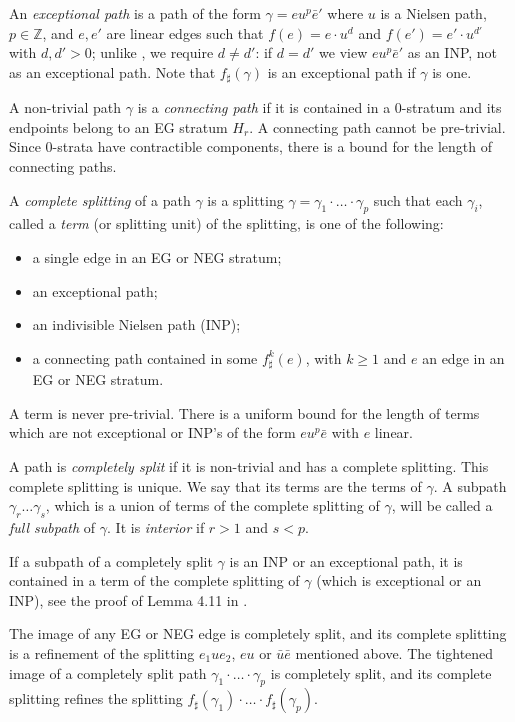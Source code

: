 \documentclass[11pt]{amsart}
\theoremstyle{remark}
\newcommand{\Z}{{\mathbb {Z}}}
\begin{document}
 An \emph{exceptional path} is a path of the form $\gamma=eu^p\bar e'$ where $u$ is a Nielsen path, $p\in\Z$,   
and $e,e'$ are  linear edges such that $f(e)=e\cdot u^d$ and $f(e')=e'\cdot u^{d'}$ with $d,d'>0$; unlike \cite{recogn}, we require 
 $d\ne d'$: if $d=d'$ we view $eu^p\bar e'$ as an INP, 
not as an exceptional path. 
 Note that $f_\sharp(\gamma)$ is an exceptional path if $\gamma$ is one.  

A  non-trivial path $\gamma$ is a \emph{connecting path}  if it is contained in a 0-stratum and its endpoints belong to  an EG stratum $H_r$. A connecting path cannot be pre-trivial. Since 0-strata have contractible components, there is a bound for the length of connecting paths. 

A \emph{complete splitting} of a path $\gamma$ is a splitting $\gamma=\gamma_1\cdot{\dots}\cdot \gamma_p$ such that each $\gamma_i$, called a \emph{term}  (or splitting unit) of the splitting, is one of the following:
\begin{itemize}
\item a single edge in an EG or NEG stratum;
\item an exceptional path;
\item an indivisible Nielsen path (INP);
\item  a connecting path contained in some $f^k_\sharp(e)$, with $k\ge1$ and $e$ an edge in an EG or NEG stratum. 

\end{itemize}


A term is never pre-trivial. There is a uniform bound for the length of terms which are not exceptional or INP's of the form $eu^p\bar e$ with $e$ linear.  


A path is \emph{completely split} if it is non-trivial and has a complete splitting.    This complete splitting is unique. We say that its terms are the terms of $\gamma$. A subpath $\gamma_r\dots\gamma_s$, which is a union of   terms of the complete splitting of $\gamma$, will be called a \emph{full subpath} of $\gamma$. It is \emph{interior} if $r>1$ and $s<p$.




 
 If a subpath of a completely split $\gamma$ is an INP or an exceptional path, it is contained in a term of the complete splitting of $\gamma$ (which is exceptional or an INP), see the proof of Lemma 4.11 in \cite{recogn}.

The image of any   EG or NEG edge is completely split, and its complete splitting is a refinement of the splitting $e_1u e_2$, $eu$ or $\bar u\bar e$ mentioned above. 
The tightened image of a completely split path $\gamma_1\cdot{\dots}\cdot\gamma_p$ is completely split, and its  complete splitting  refines the splitting $f_\sharp(\gamma_1)\cdot{\dots}\cdot f_\sharp(\gamma_p)$. 
\end{document}
